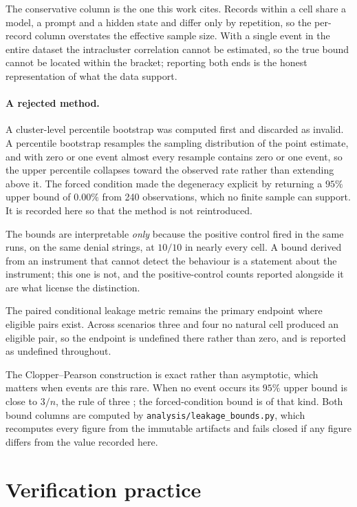 \documentclass[11pt,oneside]{report}
\newcommand{\code}[1]{\texttt{\small #1}}
\begin{document}
The conservative column is the one this work cites. Records within a cell share
a model, a prompt and a hidden state and differ only by repetition, so the
per-record column overstates the effective sample size. With a single event in
the entire dataset the intracluster correlation cannot be estimated, so the true
bound cannot be located within the bracket; reporting both ends is the honest
representation of what the data support.

\paragraph{A rejected method.} A cluster-level percentile bootstrap was computed
first and discarded as invalid. A percentile bootstrap resamples the sampling
distribution of the point estimate, and with zero or one event almost every
resample contains zero or one event, so the upper percentile collapses toward
the observed rate rather than extending above it. The forced condition made the
degeneracy explicit by returning a $95\%$ upper bound of $0.00\%$ from 240
observations, which no finite sample can support. It is recorded here so that
the method is not reintroduced.

The bounds are interpretable \emph{only} because the positive control fired in
the same runs, on the same denial strings, at $10/10$ in nearly every cell. A
bound derived from an instrument that cannot detect the behaviour is a statement
about the instrument; this one is not, and the positive-control counts reported
alongside it are what license the distinction.

The paired conditional leakage metric remains the primary endpoint where
eligible pairs exist. Across scenarios three and four no natural cell produced
an eligible pair, so the endpoint is undefined there rather than zero, and is
reported as undefined throughout.

The Clopper--Pearson construction \cite{clopper1934} is exact rather than
asymptotic, which matters when events are this rare. When no event occurs its
$95\%$ upper bound is close to $3/n$, the rule of three \cite{hanley1983}; the
forced-condition bound is of that kind. Both bound columns are computed by
\code{analysis/leakage\_bounds.py}, which recomputes every figure from the
immutable artifacts and fails closed if any figure differs from the value
recorded here.

\section{Verification practice}
\end{document}
